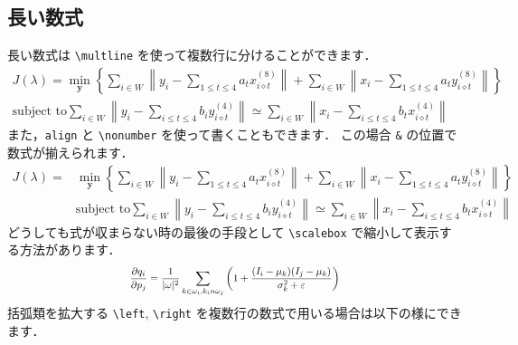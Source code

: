 \documentclass[dvipdfmx,disablejfam,nosetpagesize,12pt]{jsbook}
\begin{document}
\subsection{長い数式}
長い数式は \verb+\multline+ を使って複数行に分けることができます．
\begin{multline}
   J(\lambda) = 
   \min_{\bm{y}}
      \left\{
         \sum_{i \in W}
         \left\| y_i - \sum_{1 \le t \le 4} a_t x_{i \diamond t}^{(8)} \right\|
         +
         \sum_{i \in W}
         \left\| x_i - \sum_{1 \le t \le 4} a_t y_{i \diamond t}^{(8)} \right\|
      \right\} 
   \\
   \text{subject to}
      \sum_{i \in W} \left\| y_i - \sum_{i \le t \le 4} b_i y_{i \diamond t}^{(4)} \right\|
      \simeq
      \sum_{i \in W} \left\| x_i - \sum_{i \le t \le 4} b_t x_{i \diamond t}^{(4)} \right\|
   \label{eq:long equation with multline}
\end{multline}
また，\verb+align+ と \verb+\nonumber+ を使って書くこともできます．
この場合 \verb+&+ の位置で数式が揃えられます．
\begin{align}
   J(\lambda) = 
   & \min_{\bm{y}}
      \left\{
         \sum_{i \in W}
         \left\| y_i - \sum_{1 \le t \le 4} a_t x_{i \diamond t}^{(8)} \right\|
         +
         \sum_{i \in W}
         \left\| x_i - \sum_{1 \le t \le 4} a_t y_{i \diamond t}^{(8)} \right\|
      \right\} 
   \nonumber \\
   & \text{subject to}
      \sum_{i \in W} \left\| y_i - \sum_{i \le t \le 4} b_i y_{i \diamond t}^{(4)} \right\|
      \simeq
      \sum_{i \in W} \left\| x_i - \sum_{i \le t \le 4} b_t x_{i \diamond t}^{(4)} \right\|
   \label{eq:long equation with align}
\end{align}
どうしても式が収まらない時の最後の手段として \verb+\scalebox+ で縮小して表示する方法があります．
\begin{equation}
   \scalebox{0.8}{$ \displaystyle
      \frac{\partial q_i}{\partial p_j} =
      \frac{1}{|\omega|^2}
         \sum_{k\in\omega_i,k_in\omega_j}
         \left(
            1 + \frac{(I_i-\mu_k)(I_j-\mu_k)}{\sigma_k^2 + \varepsilon}
         \right)
   $}
\end{equation}
%
括弧類を拡大する \verb+\left+, \verb+\right+ を複数行の数式で用いる場合は以下の様にできます．
\end{document}
